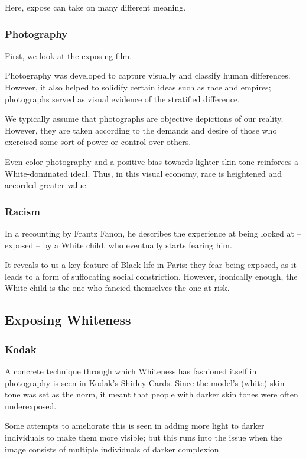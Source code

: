 \documentclass[openany]{book}
\begin{document}
Here, expose can take on many different meaning.

\subsubsection{Photography}
First, we look at the exposing film.

Photography was developed to capture visually and classify human differences. However, it also helped to solidify certain ideas such as race and empires; photographs served as visual evidence of the stratified difference.

We typically assume that photographs are objective depictions of our reality. However, they are taken according to the demands and desire of those who exercised some sort of power or control over others.

Even color photography and a positive bias towards lighter skin tone reinforces a White-dominated ideal. Thus, in this visual economy, race is heightened and accorded greater value.

\subsubsection{Racism}
In a recounting by Frantz Fanon, he describes the experience at being looked at -- exposed -- by a White child, who eventually starts fearing him.

It reveals to us a key feature of Black life in Paris: they fear being exposed, as it leads to a form of suffocating social constriction. However, ironically enough, the White child is the one who fancied themselves the one at risk.

\subsection{Exposing Whiteness}
\subsubsection{Kodak}
A concrete technique through which Whiteness has fashioned itself in photography is seen in Kodak's Shirley Cards. Since the model's (white) skin tone was set as the norm, it meant that people with darker skin tones were often underexposed.

Some attempts to ameliorate this is seen in adding more light to darker individuals to make them more visible; but this runs into the issue when the image consists of multiple individuals of darker complexion.
\end{document}
